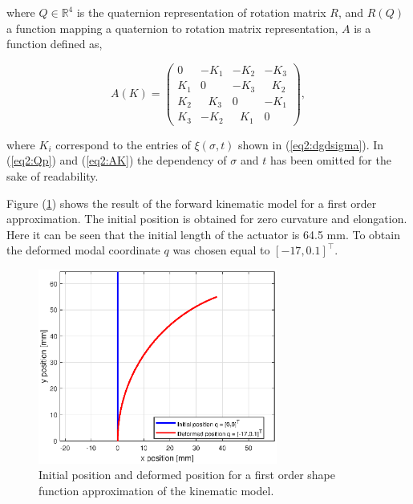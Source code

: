 where $Q \in \mathbb{R}^4$ is the quaternion representation of rotation matrix $R$, and $R(Q)$ a function mapping a quaternion to rotation matrix representation, $A$ is a function defined as,


\begin{equation}
    A(K) = \begin{pmatrix} 0 & -K_1 & -K_2 & -K_3 \\ K_1 & 0 & -K_3 & \hspace{8pt}K_2 \\ K_2 & \hspace{8pt}K_3 & 0 & -K_1 \\ K_3 & -K_2 & \hspace{8pt}K_1 & 0 \end{pmatrix},
    \label{eq2:AK}
\end{equation}

where $K_i$ correspond to the entries of $\xi(\sigma,t)$ shown in (\ref{eq2:dgdsigma}). In  (\ref{eq2:Qp}) and (\ref{eq2:AK}) the dependency of $\sigma$ and $t$ has been omitted for the sake of readability.

Figure (\ref{fig1:forward_kinematic}) shows the result of the forward kinematic model for a first order approximation. The initial position is obtained for zero curvature and elongation. Here it can be seen that the initial length of the actuator is 64.5 mm. To obtain the deformed modal coordinate $q$ was chosen equal to $[-17,0.1]^\top$. 



\begin{figure}[H]
    \centering
    \includegraphics[width = 0.7\textwidth]{Figures/Chapter2/fkin1701.eps}
    \caption{Initial position and deformed position for a first order shape function approximation of the kinematic model.}
    \label{fig1:forward_kinematic}
\end{figure}

